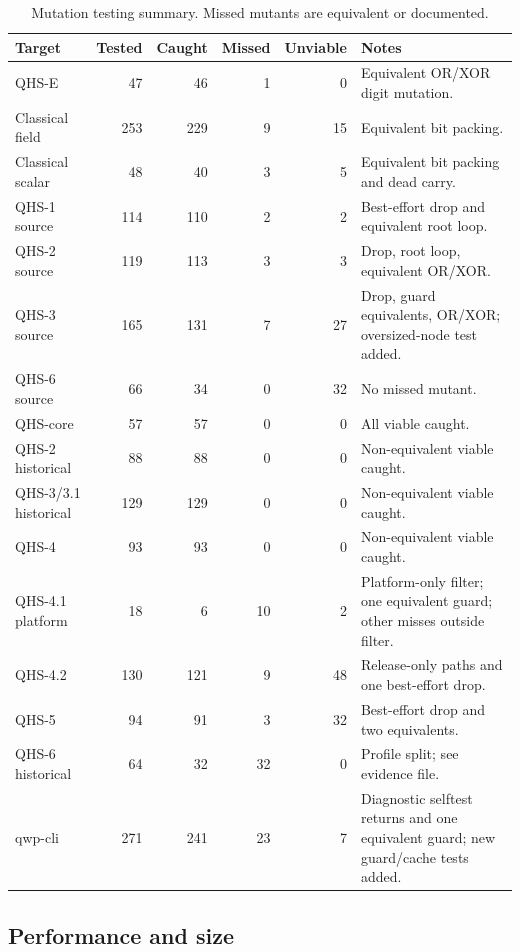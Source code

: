 \documentclass[11pt,a4paper]{article}
\begin{document}
\begin{table}[ht]
\centering
\caption{Mutation testing summary. Missed mutants are equivalent or documented.}
\label{tab:mutation}
\small
\begin{tabularx}{\textwidth}{@{}l r r r r Y@{}}
\toprule
Target & Tested & Caught & Missed & Unviable & Notes\\
\midrule
QHS-E & 47 & 46 & 1 & 0 & Equivalent OR/XOR digit mutation.\\
Classical field & 253 & 229 & 9 & 15 & Equivalent bit packing.\\
Classical scalar & 48 & 40 & 3 & 5 & Equivalent bit packing and dead carry.\\
QHS-1 source & 114 & 110 & 2 & 2 & Best-effort drop and equivalent root loop.\\
QHS-2 source & 119 & 113 & 3 & 3 & Drop, root loop, equivalent OR/XOR.\\
QHS-3 source & 165 & 131 & 7 & 27 & Drop, guard equivalents, OR/XOR; oversized-node test added.\\
QHS-6 source & 66 & 34 & 0 & 32 & No missed mutant.\\
QHS-core & 57 & 57 & 0 & 0 & All viable caught.\\
QHS-2 historical & 88 & 88 & 0 & 0 & Non-equivalent viable caught.\\
QHS-3/3.1 historical & 129 & 129 & 0 & 0 & Non-equivalent viable caught.\\
QHS-4 & 93 & 93 & 0 & 0 & Non-equivalent viable caught.\\
QHS-4.1 platform & 18 & 6 & 10 & 2 & Platform-only filter; one equivalent guard; other misses outside filter.\\
QHS-4.2 & 130 & 121 & 9 & 48 & Release-only paths and one best-effort drop.\\
QHS-5 & 94 & 91 & 3 & 32 & Best-effort drop and two equivalents.\\
QHS-6 historical & 64 & 32 & 32 & 0 & Profile split; see evidence file.\\
qwp-cli & 271 & 241 & 23 & 7 & Diagnostic selftest returns and one equivalent guard; new guard/cache tests added.\\
\bottomrule
\end{tabularx}
\end{table}
\FloatBarrier

\subsection{Performance and size}
\end{document}
